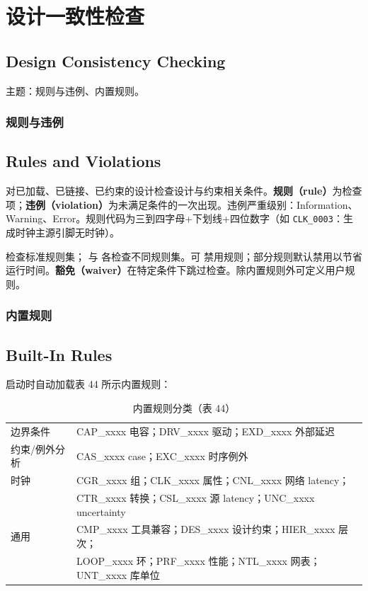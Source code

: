 \section{设计一致性检查}
\subsection*{Design Consistency Checking}

主题：规则与违例、内置规则。

\subsubsection{规则与违例}
\subsection*{Rules and Violations}

对已加载、已链接、已约束的设计检查设计与约束相关条件。\textbf{规则（rule）}为检查项；\textbf{违例（violation）}为未满足条件的一次出现。违例严重级别：Information、Warning、Error。规则代码为三到四字母+下划线+四位数字（如 \texttt{CLK\_0003}：生成时钟主源引脚无时钟）。

 检查标准规则集； 与  各检查不同规则集。可  禁用规则；部分规则默认禁用以节省运行时间。\textbf{豁免（waiver）}在特定条件下跳过检查。除内置规则外可定义用户规则。

\subsubsection{内置规则}
\subsection*{Built-In Rules}

启动时自动加载表 44 所示内置规则：

\begin{table}[htbp]
\centering
\caption{内置规则分类（表 44）}
\small
\begin{tabular}{|l|l|}
\hline
边界条件 & CAP\_xxxx 电容；DRV\_xxxx 驱动；EXD\_xxxx 外部延迟 \\
约束/例外分析 & CAS\_xxxx case；EXC\_xxxx 时序例外 \\
时钟 & CGR\_xxxx 组；CLK\_xxxx 属性；CNL\_xxxx 网络 latency；\\
& CTR\_xxxx 转换；CSL\_xxxx 源 latency；UNC\_xxxx uncertainty \\
通用 & CMP\_xxxx 工具兼容；DES\_xxxx 设计约束；HIER\_xxxx 层次；\\
& LOOP\_xxxx 环；PRF\_xxxx 性能；NTL\_xxxx 网表；UNT\_xxxx 库单位 \\
\hline
\end{tabular}
\end{table}

